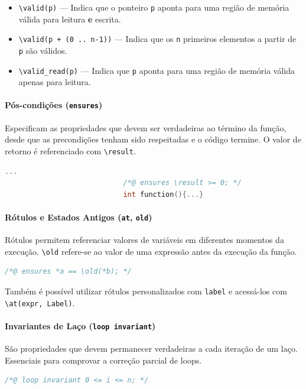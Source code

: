 \documentclass{article}
\begin{document}
\begin{itemize}
    \item \texttt{\textbackslash valid(p)} — Indica que o ponteiro \texttt{p} aponta para uma região de memória válida para leitura \textbf{e} escrita.
    \item \texttt{\textbackslash valid(p + (0 .. n-1))} — Indica que os \texttt{n} primeiros elementos a partir de \texttt{p} são válidos.
    \item \texttt{\textbackslash valid\_read(p)} — Indica que \texttt{p} aponta para uma região de memória válida apenas para leitura.
\end{itemize}

\paragraph{Pós-condições (\texttt{ensures})} 
Especificam as propriedades que devem ser verdadeiras ao término da função, desde que as precondições tenham sido respeitadas e o código termine. O valor de retorno é referenciado com \texttt{\textbackslash result}.
\begin{lstlisting}[language=C]
                            ...
                            /*@ ensures \result >= 0; */
                            int function(){...}
\end{lstlisting}

\paragraph{Rótulos e Estados Antigos (\texttt{at}, \texttt{old})} 
Rótulos permitem referenciar valores de variáveis em diferentes momentos da execução. \texttt{\textbackslash old} refere-se ao valor de uma expressão antes da execução da função.
\begin{lstlisting}[language=C]
                            /*@ ensures *a == \old(*b); */
\end{lstlisting}
Também é possível utilizar rótulos personalizados com \texttt{label} e acessá-los com \texttt{\textbackslash at(expr, Label)}.

\paragraph{Invariantes de Laço (\texttt{loop invariant})} 
São propriedades que devem permanecer verdadeiras a cada iteração de um laço. Essenciais para comprovar a correção parcial de loops.
\begin{lstlisting}[language=C]
                            /*@ loop invariant 0 <= i <= n; */
\end{lstlisting}
\end{document}
